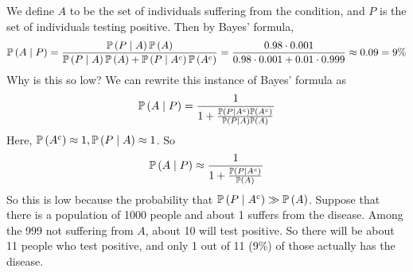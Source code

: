 \documentclass{article}
\begin{document}
We define $A$ to be the set of individuals suffering from the condition, and $P$ is the set of individuals testing positive. Then by Bayes' formula,
\[ \mathbb{P}\left({A \mid P}\right) = \frac{\mathbb{P}\left({P \mid A}\right)\mathbb{P}\left({A}\right)}{\mathbb{P}\left({P \mid A}\right)\mathbb{P}\left({A}\right) + \mathbb{P}\left({P \mid {A}^c}\right)\mathbb{P}\left({{A}^c}\right)} = \frac{0.98 \cdot 0.001}{0.98 \cdot 0.001 + 0.01 \cdot 0.999} \approx 0.09 = 9\% \]
Why is this so low? We can rewrite this instance of Bayes' formula as
\[ \mathbb{P}\left({A \mid P}\right) = \frac{1}{1 + \frac{\mathbb{P}\left({P \mid {A}^c}\right)\mathbb{P}\left({{A}^c}\right)}{\mathbb{P}\left({P \mid A}\right)\mathbb{P}\left({A}\right)}} \]
Here, $\mathbb{P}\left({{A}^c}\right) \approx 1, \mathbb{P}\left({P \mid A}\right) \approx 1$. So
\[ \mathbb{P}\left({A \mid P}\right) \approx \frac{1}{1 + \frac{\mathbb{P}\left({P \mid {A}^c}\right)}{\mathbb{P}\left({A}\right)}} \]
So this is low because the probability that $\mathbb{P}\left({P \mid {A}^c}\right) \gg \mathbb{P}\left({A}\right)$. Suppose that there is a population of 1000 people and about 1 suffers from the disease. Among the 999 not suffering from $A$, about 10 will test positive. So there will be about 11 people who test positive, and only 1 out of 11 (9\%) of those actually has the disease.
\end{document}
